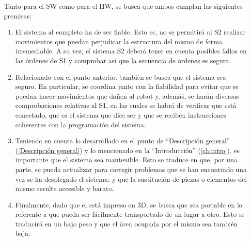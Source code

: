Tanto para el \ac{SW} como para el \ac{HW}, se busca que ambos cumplan las siguientes premisas:

\begin{enumerate}
    \item El sistema al completo ha de ser fiable. Esto es, no se permitirá al \ac{S2} realizar movimientos que puedan perjudicar la estructura del mismo de forma irremediable. A su vez, el sistema \ac{S2} deberá tener en cuenta posibles fallos en las órdenes de \ac{S1} y comprobar así que la secuencia de órdenes es segura.
    \item Relacionado con el punto anterior, también se busca que el sistema sea seguro. En particular, se coordina junto con la fiabilidad para evitar que se puedan hacer movimientos que dañen al robot y, ademáś, se harán diversas comprobaciones relativas al \ac{S1}, en las cuales se habrá de verificar que está conectado, que es el sistema que dice ser y que se reciben instrucciones coherentes con la programación del sistema.
    \item Teniendo en cuenta lo desarrollado en el punto de ``Descripción general'' (\ref{Descripción general}) y lo mencionado en la ``Introducción'' (\ref{ch:intro}), es importante que el sistema sea mantenible. Esto se traduce en que, por una parte, se pueda actualizar para corregir problemas que se han encontrado una vez se ha desplegado el sistema; y que la sustitución de piezas o elementos del mismo resulte accesible y barato.
    \item Finalmente, dado que el \pArm{} está impreso en 3D, se busca que sea portable en lo referente a que pueda ser fácilmente transportado de un lugar a otro. Esto se traducirá en un bajo peso y que el área ocupada por el mismo sea también baja.
\end{enumerate}